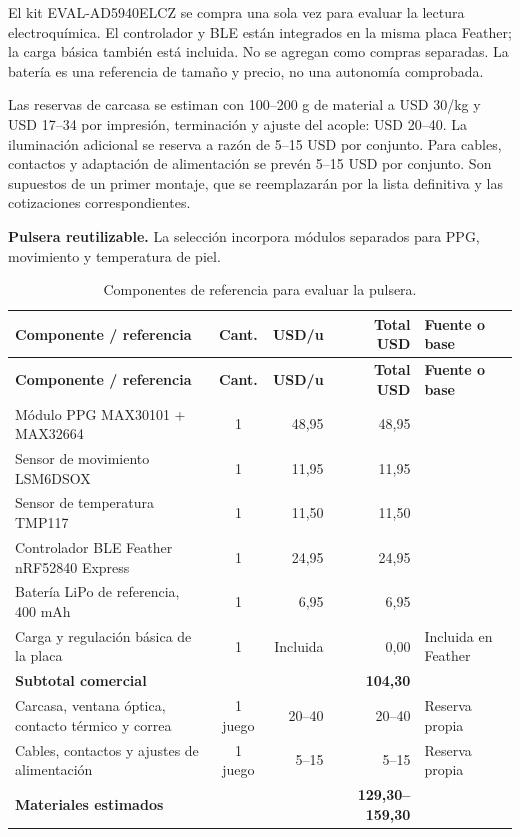 El kit EVAL-AD5940ELCZ se compra una sola vez para evaluar la lectura electroquímica. El controlador y BLE están integrados en la misma placa Feather; la carga básica también está incluida. No se agregan como compras separadas. La batería es una referencia de tamaño y precio, no una autonomía comprobada.

Las reservas de carcasa se estiman con 100--200 g de material a USD 30/kg y USD 17--34 por impresión, terminación y ajuste del acople: USD 20--40. La iluminación adicional se reserva a razón de 5--15 USD por conjunto. Para cables, contactos y adaptación de alimentación se prevén 5--15 USD por conjunto. Son supuestos de un primer montaje, que se reemplazarán por la lista definitiva y las cotizaciones correspondientes.

\noindent\textbf{Pulsera reutilizable.}
La selección incorpora módulos separados para PPG, movimiento y temperatura de piel.
{\footnotesize
\setlength{\tabcolsep}{4pt}
\renewcommand{\arraystretch}{1.18}
\begin{xltabular}{\linewidth}{@{}>{\raggedright\arraybackslash}X c r r >{\raggedright\arraybackslash}p{2.2cm}@{}}
\caption{Componentes de referencia para evaluar la pulsera.}\label{tab:costo-pulsera}\\
\toprule
\textbf{Componente / referencia} & \textbf{Cant.} & \textbf{USD/u} & \textbf{Total USD} & \textbf{Fuente o base}\\
\midrule
\endfirsthead
\toprule
\textbf{Componente / referencia} & \textbf{Cant.} & \textbf{USD/u} & \textbf{Total USD} & \textbf{Fuente o base}\\
\midrule
\endhead
\bottomrule\endfoot


Módulo PPG MAX30101 + MAX32664 & 1 & 48,95 & 48,95 & \\
Sensor de movimiento LSM6DSOX & 1 & 11,95 & 11,95 & \\
Sensor de temperatura TMP117 & 1 & 11,50 & 11,50 & \\
Controlador BLE Feather nRF52840 Express & 1 & 24,95 & 24,95 & \\
Batería LiPo de referencia, 400 mAh & 1 & 6,95 & 6,95 & \\
Carga y regulación básica de la placa & 1 & Incluida & 0,00 & Incluida en Feather\\
\midrule
\textbf{Subtotal comercial} & & & \textbf{104,30} & \\
\midrule
Carcasa, ventana óptica, contacto térmico y correa & 1 juego & 20--40 & 20--40 & Reserva propia\\
Cables, contactos y ajustes de alimentación & 1 juego & 5--15 & 5--15 & Reserva propia\\
\midrule
\textbf{Materiales estimados} & & & \textbf{129,30--159,30} & \\
\bottomrule
\end{xltabular}
}


